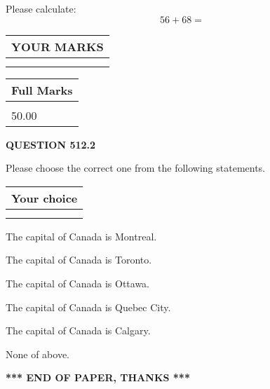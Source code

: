\documentclass[12pt]{article}
\begin{document}
  
 
Please calculate:
\begin{equation}
56 +  %
68 = \nonumber
\end{equation}
 

 

 
  
\vspace{0.2in}
  
\noindent\begin{tabular}{|l|}
\hline
 YOUR MARKS  \\
\hline
 \\ 
 \\ 
\hline
\end{tabular}
\hspace{0.05in} \begin{tabular}{|l|}
\hline
 Full Marks  \\
\hline
 \\ 
50.00 \\
\hline
\end{tabular}
{\textbf{\Large{QUESTION
512.2 
}}}
  
  
Please choose the correct one from the following statements.
  
  
\noindent\hspace{3.0in} \begin{tabular}{|l|}
\hline
Your choice \\
\hline
 \\ 
 \\ 
\hline
\end{tabular}
  
  
 
 
The capital of Canada is Montreal.
 
 
The capital of Canada is Toronto.
 
 
The capital of Canada is Ottawa.
 
 
The capital of Canada is Quebec City.
 
 
The capital of Canada is Calgary.
 
 
 None of above.
 
 
   
   
 \vspace{0.2in}
 
   
   
   
   
\vspace{1.0in} 
{\textbf{\large{ *** END OF PAPER, THANKS *** }}} 
   
\end{document}
